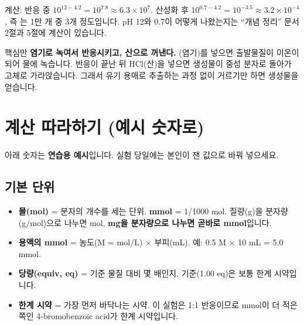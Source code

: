 \documentclass[10pt,a4paper]{article}
\newenvironment{keypoint}{\begin{callout}{핵심만}}{\end{callout}}
\begin{document}
{\small 계산: 반응 중 $10^{12-4.2} = 10^{7.8} \approx 6.3\times10^7$. 산성화 후 $10^{0.7-4.2} = 10^{-3.5} \approx 3.2\times10^{-4}$, 즉 는 1만 개 중 3개 정도입니다. pH 12와 0.7이 어떻게 나왔는지는 ``개념 정리'' 문서 2절과 5절에 계산이 있습니다.}

\begin{keypoint}
\textbf{염기로 녹여서 반응시키고, 산으로 꺼낸다.} (염기)를 넣으면 출발물질이 이온이 되어 물에 녹습니다. 반응이 끝난 뒤 HCl(산)을 넣으면 생성물이 중성 분자로 돌아가 고체로 가라앉습니다. 그래서 유기 용매로 추출하는 과정 없이 거르기만 하면 생성물을 얻습니다.
\end{keypoint}

\section{계산 따라하기 (예시 숫자로)}

아래 숫자는 \textbf{연습용 예시}입니다. 실험 당일에는 본인이 잰 값으로 바꿔 넣으세요.

\subsection*{기본 단위}
\begin{itemize}[leftmargin=5mm,itemsep=0.5mm]
\item \textbf{몰(mol)} = 분자의 개수를 세는 단위. \textbf{mmol} = 1/1000 mol. 질량(g)을 분자량(g/mol)으로 나누면 mol, \textbf{mg을 분자량으로 나누면 곧바로 mmol}입니다.
\item \textbf{용액의 mmol} = 농도(M = mol/L) $\times$ 부피(mL). 예: 0.5 M $\times$ 10 mL = 5.0 mmol.
\item \textbf{당량(equiv, eq)} = 기준 물질 대비 몇 배인지. 기준(1.00 eq)은 보통 한계 시약입니다.
\item \textbf{한계 시약} = 가장 먼저 바닥나는 시약. 이 실험은 1:1 반응이므로 mmol이 더 적은 쪽인 4-bromobenzoic acid가 한계 시약입니다.
\end{itemize}
\end{document}
